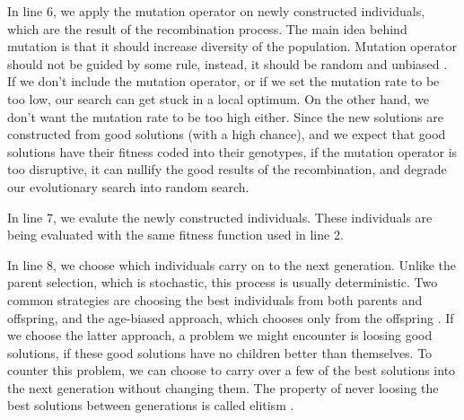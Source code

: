 In line 6, we apply the mutation operator on newly constructed individuals, which are the result of the recombination process. The main idea behind mutation is that it should increase diversity of the population. Mutation operator should not be guided by some rule, instead, it should be random and unbiased \citep{eiben2015evolutionarycomputing}. If we don't include the mutation operator, or if we set the mutation rate to be too low, our search can get stuck in a local optimum. On the other hand, we don't want the mutation rate to be too high either. Since the new solutions are constructed from good solutions (with a high chance), and we expect that good solutions have their fitness coded into their genotypes, if the mutation operator is too disruptive, it can nullify the good results of the recombination, and degrade our evolutionary search into random search. 

In line 7, we evalute the newly constructed individuals. These individuals are being evaluated with the same fitness function used in line 2.

In line 8, we choose which individuals carry on to the next generation. Unlike the parent selection, which is stochastic, this process is usually deterministic. Two common strategies are choosing the best individuals from both parents and offspring, and the age-biased approach, which chooses only from the offspring \citep{eiben2015evolutionarycomputing}. If we choose the latter approach, a problem we might encounter is loosing good solutions, if these good solutions have no children better than themselves. To counter this problem, we can choose to carry over a few of the best solutions into the next generation without changing them. The property of never loosing the best solutions between generations is called elitism \citep{cupic2019evolucijskoracunarstvo}.